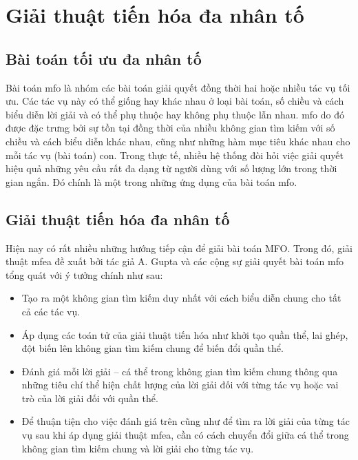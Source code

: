 \section{Giải thuật tiến hóa đa nhân tố} \label{chap_coso:sec:mfea}
\subsection{Bài toán tối ưu đa nhân tố} \label{chap_coso:sec_mfea:subsec:baitoandanhanto}
Bài toán \gls{mfo} là nhóm các bài toán giải quyết đồng thời hai hoặc nhiều tác vụ tối ưu. Các tác vụ này có thể giống hay khác nhau ở loại bài toán, số chiều và cách biểu diễn lời giải và có thể phụ thuộc hay không phụ thuộc lẫn nhau. \gls{mfo} do đó được đặc trưng bởi sự tồn tại đồng thời của nhiều không gian tìm kiếm với số chiều và cách biểu diễn khác nhau, cũng như những hàm mục tiêu khác nhau cho mỗi tác vụ (bài toán) con. Trong thực tế, nhiều hệ thống đòi hỏi việc giải quyết hiệu quả những yêu cầu rất đa dạng từ người dùng với số lượng lớn trong thời gian ngắn. Đó chính là một trong những ứng dụng của bài toán \gls{mfo}.

\subsection{Giải thuật tiến hóa đa nhân tố} \label{chap_coso:sec_mfea:subsec:gttienhoadanhanto}

Hiện nay có rất nhiều những hướng tiếp cận để giải bài toán MFO. Trong đó, giải thuật \gls{mfea} đề xuất bởi tác giả A. Gupta và các cộng sự \cite{gupta_multifactorial_2016} giải quyết bài toán \gls{mfo} tổng quát với ý tưởng chính như sau:
\begin{itemize}
	\item Tạo ra một không gian tìm kiếm duy nhất với cách biểu diễn chung cho tất cả các tác vụ.
	\item Áp dụng các toán tử của giải thuật tiến hóa như khởi tạo quần thể, lai ghép, đột biến lên không gian tìm kiếm chung để biến đổi quần thể.
	\item Đánh giá mỗi lời giải – cá thể trong không gian tìm kiếm chung thông qua những tiêu chí thể hiện chất lượng của lời giải đối với từng tác vụ hoặc vai trò của lời giải đối với quần thể.
	\item Để thuận tiện cho việc đánh giá trên cũng như để tìm ra lời giải của từng tác vụ sau khi áp dụng giải thuật \gls{mfea}, cần có cách chuyển đổi giữa cá thể trong không gian tìm kiếm chung và lời giải cho từng tác vụ.
\end{itemize}


